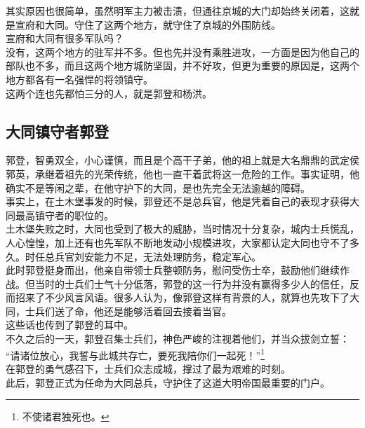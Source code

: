 \begin{multicols}{\theparacolNo}
其实原因也很简单，虽然明军主力被击溃，但通往京城的大门却始终关闭着，这就是宣府和大同。守住了这两个地方，就守住了京城的外围防线。\\

宣府和大同有很多军队吗？\\

没有，这两个地方的驻军并不多。但也先并没有乘胜进攻，一方面是因为他自己的部队也不多，而且这两个地方城防坚固，并不好攻，但更为重要的原因是，这两个地方都各有一名强悍的将领镇守。\\

这两个连也先都怕三分的人，就是郭登和杨洪。\\

\subsection{大同镇守者郭登}
郭登，智勇双全，小心谨慎，而且是个高干子弟，他的祖上就是大名鼎鼎的武定侯郭英，承继着祖先的光荣传统，他也一直干着武将这一危险的工作。事实证明，他确实不是等闲之辈，在他守护下的大同，是也先完全无法逾越的障碍。\\

事实上，在土木堡事发的时候，郭登还不是总兵官，他是凭着自己的表现才获得大同最高镇守者的职位的。\\

土木堡失败之时，大同也受到了极大的威胁，当时情况十分复杂，城内士兵慌乱，人心惶惶，加上还有也先军队不断地发动小规模进攻，大家都认定大同也守不了多久。时任总兵官刘安能力不足，无法处理防务，稳定军心。\\

此时郭登挺身而出，他亲自带领士兵整顿防务，慰问受伤士卒，鼓励他们继续作战。但当时的士兵们士气十分低落，郭登的这一行为并没有赢得多少人的信任，反而招来了不少风言风语。很多人认为，像郭登这样有背景的人，就算也先攻下了大同，士兵们送了命，他还是能够活着回去接着当官。\\

这些话也传到了郭登的耳中。\\

不久之后的一天，郭登召集士兵们，神色严峻的注视着他们，并当众拔剑立誓：\\

“请诸位放心，我誓与此城共存亡，要死我陪你们一起死！”\footnote{不使诸君独死也。}\\

在郭登的勇气感召下，士兵们众志成城，撑过了最为艰难的时刻。\\

此后，郭登正式为任命为大同总兵，守护住了这道大明帝国最重要的门户。\\


\end{multicols}
